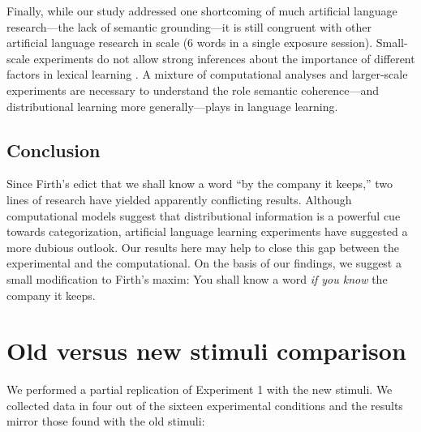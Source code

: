 \documentclass[man,floatsintext]{apa6}
\begin{document}
Finally, while our study addressed one shortcoming of much artificial language research---the lack of semantic grounding---it is still congruent with other artificial language research in scale (6 words in a single exposure session). Small-scale experiments do not allow strong inferences about the importance of different factors in lexical learning \citep{romberg2010, frank2013}. A mixture of computational analyses and larger-scale experiments are necessary to understand the role semantic coherence---and distributional learning more generally---plays in language learning.

\subsection{Conclusion}
Since Firth's edict that we shall know a word ``by the company it keeps,'' two lines of research have yielded apparently conflicting results. Although computational models suggest that distributional information is a powerful cue towards categorization, artificial language learning experiments have suggested a more dubious outlook. Our results here may help to close this gap between the experimental and the computational. On the basis of our findings, we suggest a small modification to Firth's maxim: You shall know a word \emph{if you know} the company it keeps.

\newpage



\appendix
\section{Old versus new stimuli comparison}
\label{old-vs-new}

We performed a partial replication of Experiment 1 with the new stimuli. We collected data in four out of the sixteen experimental conditions and the results mirror those found with the old stimuli:
\end{document}
